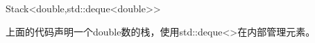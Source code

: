 \begin{cpp}
Stack<double,std::deque<double>>
\end{cpp}

上面的代码声明一个double数的栈，使用std::deque<>在内部管理元素。















